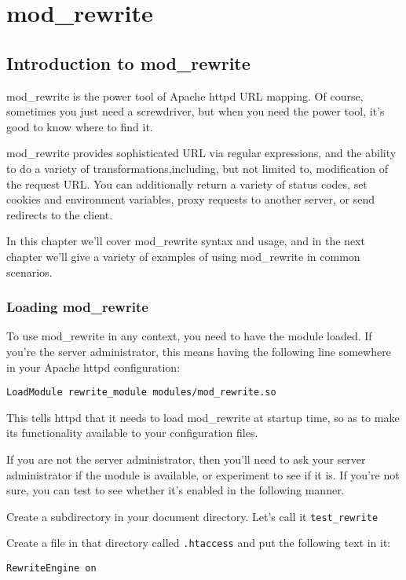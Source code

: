 \part{mod\_rewrite}
\label{partrewrite}

\chapter{Introduction to mod\_rewrite}
\label{rewrite_intro}

mod\_rewrite is the power tool of Apache httpd URL mapping. Of course, sometimes you just need a screwdriver, but when you need the power tool, it's good to know where to find it.

mod\_rewrite provides sophisticated URL via regular expressions, and the ability to do a variety of transformations,including, but not limited to, modification of the request URL. You can additionally return a variety of status codes, set cookies and environment variables, proxy requests to another server, or send redirects to the client.

In this chapter we'll cover mod\_rewrite syntax and usage, and in the next chapter we'll give a variety of examples of using mod\_rewrite in common scenarios.

\section{Loading mod\_rewrite}

To use mod\_rewrite in any context, you need to have the module loaded. If you're the server administrator, this means having the following line somewhere in your Apache httpd configuration:

\verb~LoadModule rewrite_module modules/mod_rewrite.so~

This tells httpd that it needs to load mod\_rewrite at startup time, so as to make its functionality available to your configuration files.

If you are not the server administrator, then you'll need to ask your server administrator if the module is available, or experiment to see if it is. If you're not sure, you can test to see whether it's enabled in the following manner.

Create a subdirectory in your document directory. Let's call it \verb~test_rewrite~

Create a file in that directory called \verb~.htaccess~ and put the following text in it:

\verb~RewriteEngine on~

